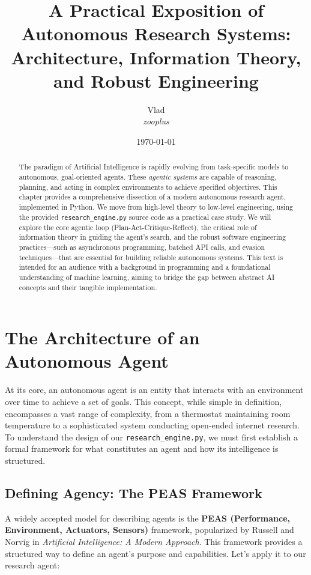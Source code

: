 \documentclass[12pt, a4paper]{article}
\author{Vlad  \\ \textit{zooplus}}
\title{\textbf{A Practical Exposition of Autonomous Research Systems: Architecture, Information Theory, and Robust Engineering}}
\date{\today}
\begin{document}
\maketitle

\begin{abstract}
The paradigm of Artificial Intelligence is rapidly evolving from task-specific models to autonomous, goal-oriented agents. These \textit{agentic systems} are capable of reasoning, planning, and acting in complex environments to achieve specified objectives. This chapter provides a comprehensive dissection of a modern autonomous research agent, implemented in Python. We move from high-level theory to low-level engineering, using the provided \verb|research_engine.py| source code as a practical case study. We will explore the core agentic loop (Plan-Act-Critique-Reflect), the critical role of information theory in guiding the agent's search, and the robust software engineering practices---such as asynchronous programming, batched API calls, and evasion techniques---that are essential for building reliable autonomous systems. This text is intended for an audience with a background in programming and a foundational understanding of machine learning, aiming to bridge the gap between abstract AI concepts and their tangible implementation.
\end{abstract}

\section{The Architecture of an Autonomous Agent}

At its core, an autonomous agent is an entity that interacts with an environment over time to achieve a set of goals. This concept, while simple in definition, encompasses a vast range of complexity, from a thermostat maintaining room temperature to a sophisticated system conducting open-ended internet research. To understand the design of our \verb|research_engine.py|, we must first establish a formal framework for what constitutes an agent and how its intelligence is structured.

\subsection{Defining Agency: The PEAS Framework}
A widely accepted model for describing agents is the \textbf{PEAS (Performance, Environment, Actuators, Sensors)} framework, popularized by Russell and Norvig in \textit{Artificial Intelligence: A Modern Approach}. This framework provides a structured way to define an agent's purpose and capabilities. Let's apply it to our research agent:
\end{document}
